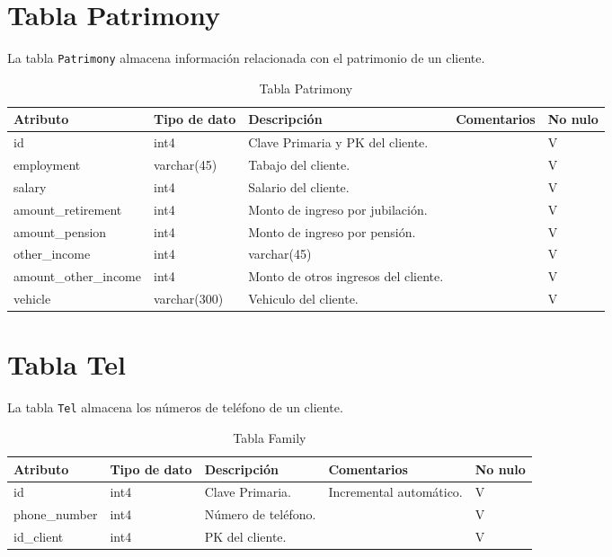 \section{Tabla Patrimony}\label{sec:table-patrimony}
La tabla \texttt{Patrimony} almacena información relacionada con el patrimonio de un cliente.

\begin{table}[H]
\centering
\label{tab:patrimony}
\begin{tabular}{|p{3cm}|p{2.5cm}|p{4.5cm}|p{4cm}|p{1cm}|}
\hline
\textbf{Atributo} & \textbf{Tipo de dato}  & \textbf{Descripción} & \textbf{Comentarios} & \textbf{No nulo} \\ \hline
id & int4 & Clave Primaria y PK del cliente. & & V \\ \hline
employment & varchar(45) & Tabajo del cliente. &  & V \\ \hline
salary & int4 & Salario del cliente. &  & V \\ \hline
amount\_retirement & int4 & Monto de ingreso por jubilación. &  & V \\ \hline
amount\_pension & int4 & Monto de ingreso por pensión. &  & V \\ \hline
other\_income & int4 & varchar(45) &  & V \\ \hline
amount\_other\_income & int4 & Monto de otros ingresos del cliente. &  & V \\ \hline
vehicle & varchar(300) & Vehiculo del cliente. &  & V \\ \hline
\end{tabular}
\caption{Tabla Patrimony}
\end{table}


\section{Tabla Tel}\label{sec:table-tel}
La tabla \texttt{Tel} almacena los números de teléfono de un cliente.

\begin{table}[H]
\centering
\label{tab:family}
\begin{tabular}{|p{3cm}|p{2.5cm}|p{4.5cm}|p{4cm}|p{1cm}|}
\hline
\textbf{Atributo} & \textbf{Tipo de dato}  & \textbf{Descripción} & \textbf{Comentarios} & \textbf{No nulo} \\ \hline
id & int4 & Clave Primaria. & Incremental automático. & V \\ \hline
phone\_number & int4 & Número de teléfono. &  & V \\ \hline
id\_client & int4 & PK del cliente. &  & V \\ \hline
\end{tabular}
\caption{Tabla Family}
\end{table}



